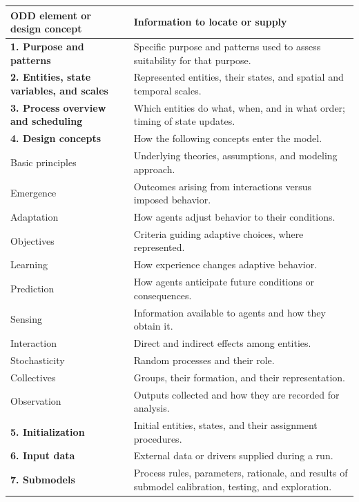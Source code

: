 \documentclass[11pt,a4paper]{article}
\begin{document}
\begin{center}
\begingroup\small
\renewcommand{\arraystretch}{1.15}
\begin{tabularx}{\linewidth}{@{}P{5.7cm}Y@{}}
\toprule
\textbf{ODD element or design concept} & \textbf{Information to locate or supply}\\
\midrule
\textbf{1. Purpose and patterns} & Specific purpose and patterns used to assess suitability for that purpose.\\
\textbf{2. Entities, state variables, and scales} & Represented entities, their states, and spatial and temporal scales.\\
\textbf{3. Process overview and scheduling} & Which entities do what, when, and in what order; timing of state updates.\\
\midrule
\textbf{4. Design concepts} & How the following concepts enter the model.\\
\quad Basic principles & Underlying theories, assumptions, and modeling approach.\\
\quad Emergence & Outcomes arising from interactions versus imposed behavior.\\
\quad Adaptation & How agents adjust behavior to their conditions.\\
\quad Objectives & Criteria guiding adaptive choices, where represented.\\
\quad Learning & How experience changes adaptive behavior.\\
\quad Prediction & How agents anticipate future conditions or consequences.\\
\quad Sensing & Information available to agents and how they obtain it.\\
\quad Interaction & Direct and indirect effects among entities.\\
\quad Stochasticity & Random processes and their role.\\
\quad Collectives & Groups, their formation, and their representation.\\
\quad Observation & Outputs collected and how they are recorded for analysis.\\
\midrule
\textbf{5. Initialization} & Initial entities, states, and their assignment procedures.\\
\textbf{6. Input data} & External data or drivers supplied during a run.\\
\textbf{7. Submodels} & Process rules, parameters, rationale, and results of submodel calibration, testing, and exploration.\\
\bottomrule
\end{tabularx}
\endgroup
\end{center}
\end{document}

